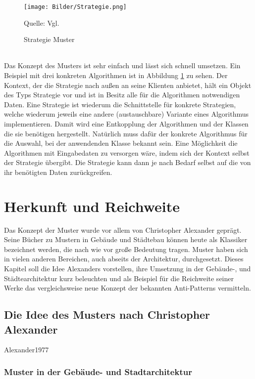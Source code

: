 \documentclass[fontsize=11pt,a4paper,final]{scrreprt}[2003/01/01]
\newcommand*{\quelle}{%
	\footnotesize Quelle: 
}
\begin{document}
\begin{figure}[H]
	\centering
	\texttt{[image: Bilder/Strategie.png]}
	\caption{Strategie Muster}
	\quelle{Vgl. \cite[S. 375]{gamma2004}} 
	\label{fig:Strategie}
\end{figure}
\ \\
Das Konzept des Musters ist sehr einfach und lässt sich schnell umsetzen. Ein Beispiel mit drei konkreten Algorithmen ist in Abbildung \ref{fig:Strategie} zu sehen. Der Kontext, der die Strategie nach außen an seine Klienten anbietet, hält ein Objekt des Typs Strategie vor und ist in Besitz alle für die Algorithmen notwendigen Daten. Eine Strategie ist wiederum die Schnittstelle für konkrete Strategien, welche wiederum jeweils eine andere (austauschbare) Variante eines Algorithmus implementieren. Damit wird eine Entkopplung der Algorithmen und der Klassen die sie benötigen hergestellt. Natürlich muss dafür der konkrete Algorithmus für die Auswahl, bei der anwendenden Klasse bekannt sein. Eine Möglichkeit die Algorithmen mit Eingabedaten zu versorgen wäre, indem sich der Kontext selbst der Strategie übergibt. Die Strategie kann dann je nach Bedarf selbst auf die von ihr benötigten Daten zurückgreifen.

\chapter{Herkunft und Reichweite}\label{Muster}
Das Konzept der Muster wurde vor allem von Christopher Alexander geprägt. Seine Bücher zu Mustern in Gebäude und Städtebau können heute als Klassiker bezeichnet werden, die nach wie vor große Bedeutung tragen. Muster haben sich in vielen anderen Bereichen, auch abseits der Architektur, durchgesetzt. Dieses Kapitel soll die Idee Alexanders vorstellen, ihre Umsetzung in der Gebäude-, und Städtearchitektur kurz beleuchten und als Beispiel für die Reichweite seiner Werke das vergleichsweise neue Konzept der bekannten Anti-Patterns vermitteln.

\section{Die Idee des Musters nach Christopher Alexander}
Alexander1977



\subsection{Muster in der Gebäude- und Stadtarchitektur}
\end{document}
